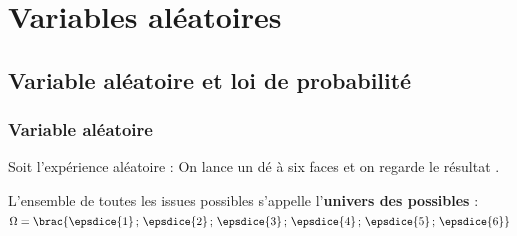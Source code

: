 \chapter{Variables aléatoires}

\section{Variable aléatoire et loi de probabilité}

\subsection{Variable aléatoire}

\begin{ex}
	Soit l'expérience aléatoire : \og On lance un dé à six faces et on regarde le résultat \fg{}.

	L'ensemble de toutes les issues possibles s'appelle l'\textbf{univers des possibles} : $\Omega = \brac{\epsdice{1}\,;\,\epsdice{2}\,;\,\epsdice{3}\,;\,\epsdice{4}\,;\,\epsdice{5}\,;\,\epsdice{6}}$


\end{ex}
